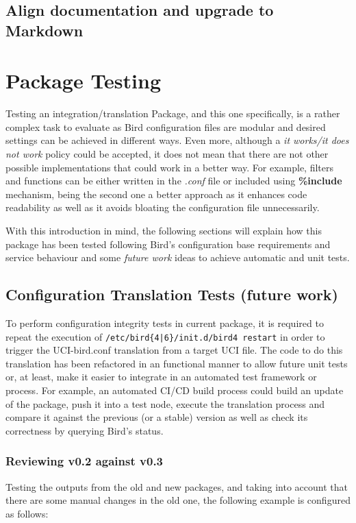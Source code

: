\subsection{Align documentation and upgrade to Markdown}

\newpage
\section{Package Testing}
Testing an integration/translation Package, and this one specifically, is a rather complex task to evaluate as Bird configuration files are modular and desired settings can be achieved in different ways. Even more, although a \textit{it works/it does not work} policy could be accepted, it does not mean that there are not other possible implementations that could work in a better way. For example, filters and functions can be either written in the \textit{.conf} file or included using \textbf{\%include} mechanism, being the second one a better approach as it enhances code readability as well as it avoids bloating the configuration file unnecessarily.


With this introduction in mind, the following sections will explain how this package has been tested following Bird's configuration base requirements and service behaviour and some \textit{future work} ideas to achieve automatic and unit tests.

\subsection{Configuration Translation Tests (future work)}
To perform configuration integrity tests in current package, it is required to repeat the execution of \texttt{/etc/bird\{4|6\}/init.d/bird4 restart} in order to trigger the UCI-bird.conf translation from a target UCI file. The code to do this translation has been refactored in an functional manner to allow future unit tests or, at least, make it easier to integrate in an automated test framework or process. For example, an automated CI/CD build process could build an update of the package, push it into a test node, execute the translation process and compare it against the previous (or a stable) version as well as check its correctness by querying Bird's status.

\subsubsection{Reviewing v0.2 against v0.3}
Testing the outputs from the old and new packages, and taking into account that there are some manual changes in the old one, the following example is configured as follows:

